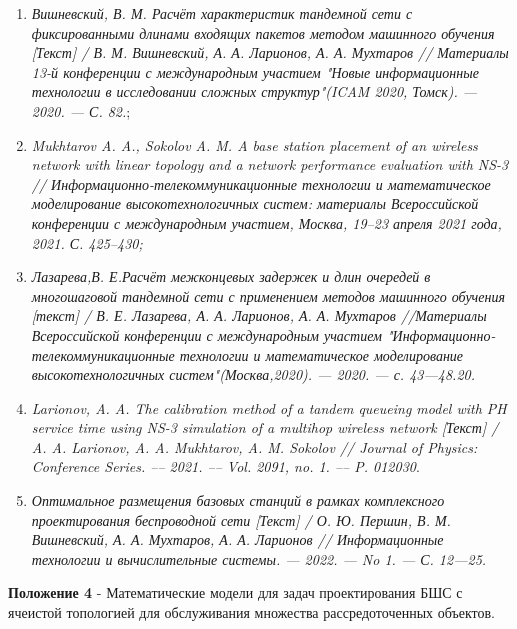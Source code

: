 \begin{frame}
\begin{minipage}[c]{1\linewidth}
\begin{enumerate}
            \item \textit{Вишневский, В. М. Расчёт характеристик тандемной сети с фиксированными длинами входящих пакетов методом машинного обучения [Текст] / В. М. Вишневский, А. А. Ларионов, А. А. Мухтаров // Материалы 13-й конференции с международным участием "Новые информационные технологии в исследовании сложных структур"(ICAM 2020, Томск). — 2020. — С. 82.};
            \item \textit{Mukhtarov A. A., Sokolov A. M. A base station placement of an wireless network with linear topology and a network performance evaluation with NS-3 // Информационно-телекоммуникационные технологии и математическое моделирование высокотехнологичных систем: материалы Всероссийской конференции с международным участием, Москва, 19–23 апреля 2021 года, 2021. С. 425–430;}
            \item \textit{Лазарева,В. Е.Расчёт межконцевых задержек и длин очередей в многошаговой тандемной сети с применением методов машинного обучения [текст] / В. Е. Лазарева, А. А. Ларионов, А. А. Мухтаров //Материалы Всероссийской конференции с международным уча­стием "Информационно-телекоммуникационные технологии и мате­матическое моделирование высокотехнологичных систем"(Москва,2020). — 2020. — с. 43—48.20.}
            \item \textit{Larionov, A. A. The calibration method of a tandem queueing model with PH service time using NS-3 simulation of a multihop wireless network [Текст] / A. A. Larionov, A. A. Mukhtarov, A. M. Sokolov // Journal of Physics: Conference Series. –– 2021. –– Vol. 2091, no. 1. –– P. 012030}.
            \item \textit{Оптимальное размещения базовых станций в рамках комплексного проектирования беспроводной сети [Текст] / О. Ю. Першин, В. М. Вишневский, А. А. Мухтаров, А. А. Ларионов // Информационные технологии и вычислительные системы. — 2022. — No 1. — С. 12—25.}
        \end{enumerate}
    \end{minipage}

\end{frame}

\begin{frame}
    \begin{center}
        {\textbf{Положение 4} - Математические модели для задач проектирования БШС с ячеистой топологией для обслуживания множества рассредоточенных объектов.}
    \end{center}

    \fontsize{8pt}{7.2}\selectfont

\end{frame}



